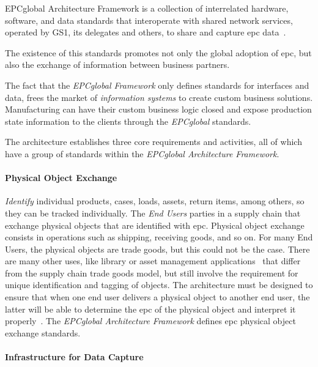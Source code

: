 EPCglobal Architecture Framework is a collection of interrelated hardware, software, and data standards that interoperate with shared network services, operated by GS1, its delegates and others, to share and capture \ac{epc} data~\cite{Architecture6framework20140414Pdf}.

The existence of this standards promotes not only the global adoption of \ac{epc}, but also the exchange of information between business partners. 

The fact that the \emph{EPCglobal Framework} only defines standards for interfaces and data, frees the market of \emph{information systems} to create custom business solutions. Manufacturing can have their custom business logic closed and expose production state information to the clients through the \emph{EPCglobal} standards.

The architecture establishes three core requirements and activities, all of which have a group of standards within the \emph{EPCglobal Architecture Framework}.

\paragraph{Physical Object Exchange} 

\emph{Identify} individual products, cases, loads, assets, return items, among others, so they can be tracked individually.
The \emph{End Users} parties in a supply chain that exchange physical objects that are identified with \ac{epc}.
Physical object exchange consists in operations such as shipping, receiving goods, and so on.
For many End Users, the physical objects are trade goods, but this could not be the case.
There are many other uses, like library or asset management applications~\cite{dong-yingliDesignInternetThings2016} that differ from the supply chain trade goods model, but still involve the requirement for unique identification and tagging of objects. 
The architecture must be designed to ensure that when one end user delivers a physical object to another end user, the latter will be able to determine the \ac{epc} of the physical object and interpret it properly~\cite{Architecture6framework20140414Pdf}.
The \emph{EPCglobal Architecture Framework} defines \ac{epc} physical object exchange standards.

\paragraph{Infrastructure for Data Capture} 

